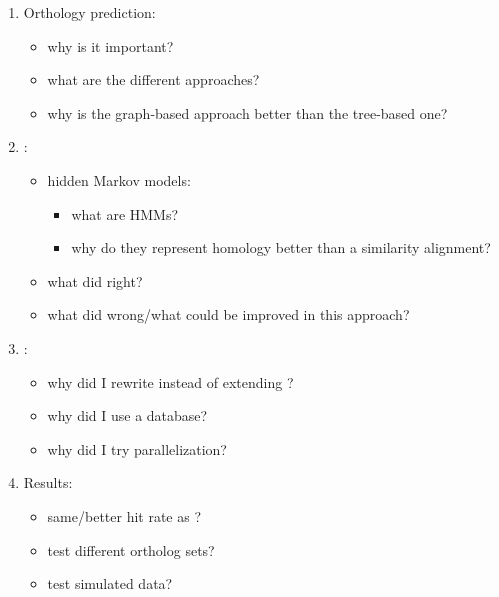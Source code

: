 \begin{enumerate}
	\item Orthology prediction:
	\begin{itemize}
		\item why is it important?
		\item what are the different approaches?
		\item why is the graph-based approach better than the tree-based one?
	\end{itemize}

\item \hamstr:
	\begin{itemize}
		\item hidden Markov models:
			\begin{itemize}
				\item what are HMMs?
				\item why do they represent homology better than a similarity alignment?
			\end{itemize}
		\item what did \hamstr right?
		\item what did \hamstr wrong/what could be improved in this approach?
	\end{itemize}

\item \pname:
	\begin{itemize}
		\item why did I rewrite instead of extending \hamstr?
		\item why did I use a database?
		\item why did I try parallelization?
	\end{itemize}

\item Results:
	\begin{itemize}
		\item same/better hit rate as \hamstr?
		\item test different ortholog sets?
		\item test simulated data?
	\end{itemize}
\end{enumerate}
